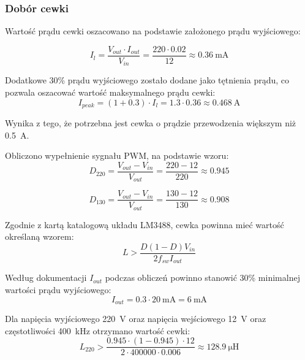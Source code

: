 \documentclass[../../main.tex]{subfiles}
\begin{document}
\subsubsection{Dobór cewki}
Wartość prądu cewki oszacowano na podstawie założonego prądu wyjściowego:

\begin{equation}
    I_{l} = \frac{V_{out} \cdot I_{out}}{V_{in}} = \frac{220 \cdot 0.02}{12} \approx \SI{0.36}{\milli\ampere}
\end{equation}

Dodatkowe 30\% prądu wyjściowego zostało dodane jako tętnienia prądu, co pozwala oszacować wartość maksymalnego prądu cewki:
\begin{equation}
    I_{peak} = (1+0.3) \cdot I_{l} = 1.3 \cdot 0.36 \approx \SI{0.468}{\ampere}
\end{equation}

Wynika z tego, że potrzebna jest cewka o prądzie przewodzenia większym niż \SI{0.5}{\ampere}.

Obliczono wypełnienie sygnału PWM, na podstawie wzoru:
\begin{equation}
    D_{220} = \frac{V_{out}-V_{in}}{V_{out}} = \frac{220-12}{220} \approx 0.945
\end{equation}

\begin{equation}
    D_{130} = \frac{V_{out}-V_{in}}{V_{out}} = \frac{130-12}{130} \approx 0.908
\end{equation}

Zgodnie z kartą katalogową układu LM3488, cewka powinna mieć wartość określaną wzorem:
\begin{equation}
    L > \frac{D(1-D)V_{in}}{2f_{sw}I_{out}}
\end{equation}

Według dokumentacji $I_{out}$ podczas obliczeń powinno stanowić 30\% minimalnej wartości prądu wyjściowego:
\begin{equation}
    I_{out} = 0.3 \cdot \SI{20}{\milli\ampere} = \SI{6}{\milli\ampere}
\end{equation}

Dla napięcia wyjściowego \SI{220}{\volt} oraz napięcia wejściowego \SI{12}{\volt} oraz częstotliwości \SI{400}{\kilo\hertz} otrzymano wartość cewki:
\begin{equation}
    L_{220} > \frac{0.945 \cdot (1-0.945) \cdot 12}{2 \cdot 400000 \cdot 0.006} \approx \SI{128.9}{\micro\henry}
\end{equation}
\end{document}
